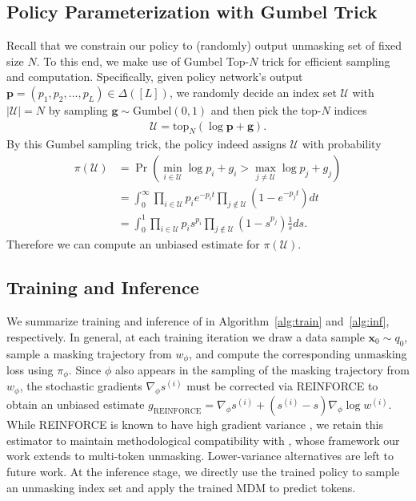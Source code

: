 \subsection{Policy Parameterization with Gumbel Trick}
Recall that we constrain our policy to (randomly) output unmasking set of fixed size $N$. To this end, we make use of Gumbel Top-$N$ trick for efficient sampling and computation. Specifically, given policy network's output $\bm p=(p_1,p_2,...,p_L)\in\Delta([L])$, we randomly decide an index set $\mathcal U$ with $|\mathcal U|=N$ by sampling $\bm g\sim\mathrm{Gumbel(0,1)}$ and then pick the top-$N$ indices
\begin{align*}
    \mathcal U=\mathrm{top}_N(\log\bm p +\bm g).
\end{align*}
By this Gumbel sampling trick, the policy indeed assigns $\mathcal U$ with probability
\begin{align*}
    \pi(\mathcal U)&=\Pr\left(\min_{i\in\mathcal U}\log p_i+g_i>\max_{j\neq\mathcal U}\log  p_j+g_j\right)\\
    &=\int_0^\infty \prod_{i\in\mathcal U} p_ie^{-p_it}\prod_{j\notin\mathcal U}(1-e^{-p_jt})dt\\
    &=\int_0^1 \prod_{i\in\mathcal U} p_is^{p_i}\prod_{j\notin\mathcal U}(1-s^{p_j})\frac{1}{s}ds.
\end{align*}
Therefore we can compute an unbiased estimate for $\pi(\mathcal U)$.
\fi


\subsection{Training and Inference}
We summarize training and inference of \alg{} in Algorithm~\ref{alg:train} and~\ref{alg:inf}, respectively. In general, at each training iteration we draw a data sample $\bm x_0\sim q_0$, sample a masking trajectory from $w_\phi$, and compute the corresponding unmasking loss using $\pi_\phi$. Since $\phi$ also appears in the sampling of the masking trajectory from $w_\phi$, the stochastic gradients $\nabla_\phi s^{(i)}$ must be corrected via REINFORCE \citep{wang2025learningorder} to obtain an unbiased estimate $g_\text{REINFORCE}=\nabla_\phi s^{(i)}+(s^{(i)}-s)\nabla_\phi\log w^{(i)}$. While REINFORCE is known to have high gradient variance \citep{shi2022gradient}, we retain this estimator to maintain methodological compatibility with \citet{wang2025learningorder}, whose framework our work extends to multi-token unmasking. Lower-variance alternatives are left to future work. At the inference stage, we directly use the trained policy to sample an unmasking index set and apply the trained MDM to predict tokens.


